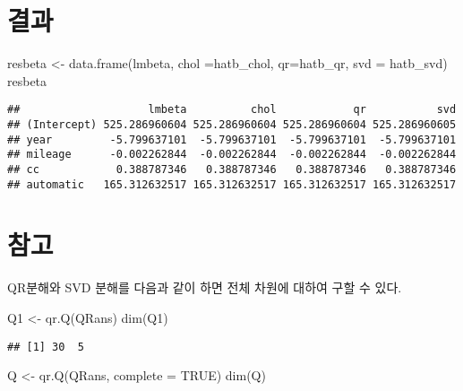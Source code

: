 \documentclass[
]{book}
\newenvironment{Shaded}{\begin{snugshade}}{\end{snugshade}}
\newcommand{\AttributeTok}[1]{\textcolor[rgb]{0.77,0.63,0.00}{#1}}
\newcommand{\ConstantTok}[1]{\textcolor[rgb]{0.00,0.00,0.00}{#1}}
\newcommand{\FunctionTok}[1]{\textcolor[rgb]{0.00,0.00,0.00}{#1}}
\newcommand{\NormalTok}[1]{#1}
\newcommand{\OtherTok}[1]{\textcolor[rgb]{0.56,0.35,0.01}{#1}}
\begin{document}
\hypertarget{uxacb0uxacfc}{%
\section{결과}\label{uxacb0uxacfc}}

\begin{Shaded}
\begin{Highlighting}[]
\NormalTok{resbeta }\OtherTok{\textless{}{-}} \FunctionTok{data.frame}\NormalTok{(lmbeta, }\AttributeTok{chol =}\NormalTok{hatb\_chol, }\AttributeTok{qr=}\NormalTok{hatb\_qr, }\AttributeTok{svd =}\NormalTok{ hatb\_svd)}
\NormalTok{resbeta}
\end{Highlighting}
\end{Shaded}

\begin{verbatim}
##                    lmbeta          chol            qr           svd
## (Intercept) 525.286960604 525.286960604 525.286960604 525.286960605
## year         -5.799637101  -5.799637101  -5.799637101  -5.799637101
## mileage      -0.002262844  -0.002262844  -0.002262844  -0.002262844
## cc            0.388787346   0.388787346   0.388787346   0.388787346
## automatic   165.312632517 165.312632517 165.312632517 165.312632517
\end{verbatim}

\hypertarget{uxcc38uxace0}{%
\section{참고}\label{uxcc38uxace0}}

QR분해와 SVD 분해를 다음과 같이 하면 전체 차원에 대하여 구할 수 있다.

\begin{Shaded}
\begin{Highlighting}[]
\NormalTok{Q1 }\OtherTok{\textless{}{-}} \FunctionTok{qr.Q}\NormalTok{(QRans)}
\FunctionTok{dim}\NormalTok{(Q1)}
\end{Highlighting}
\end{Shaded}

\begin{verbatim}
## [1] 30  5
\end{verbatim}

\begin{Shaded}
\begin{Highlighting}[]
\NormalTok{Q }\OtherTok{\textless{}{-}} \FunctionTok{qr.Q}\NormalTok{(QRans, }\AttributeTok{complete =} \ConstantTok{TRUE}\NormalTok{)}
\FunctionTok{dim}\NormalTok{(Q)}
\end{Highlighting}
\end{Shaded}
\end{document}
